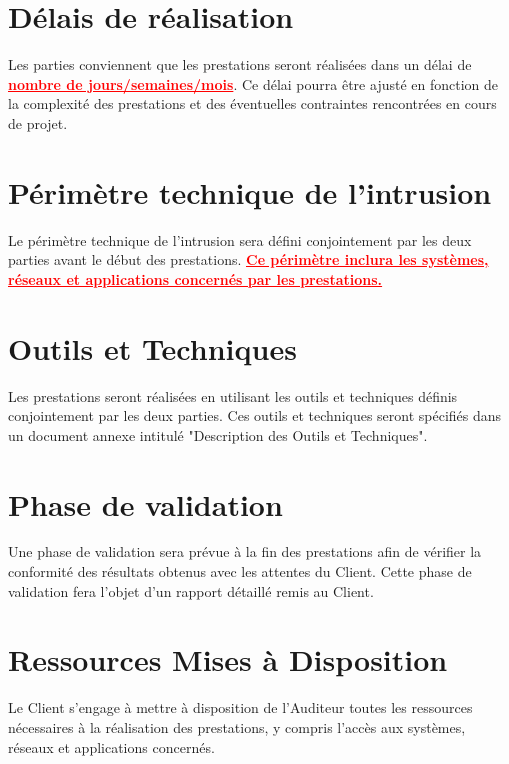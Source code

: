 \documentclass[12pt]{extarticle}
\begin{document}
\section{Délais de réalisation}
Les parties conviennent que les prestations seront réalisées dans un délai de \textcolor{red}{\textbf{\underline{nombre de jours/semaines/mois}}}. Ce délai pourra être ajusté en fonction de la complexité des prestations et des éventuelles contraintes rencontrées en cours de projet.

\section{Périmètre technique de l’intrusion}
Le périmètre technique de l'intrusion sera défini conjointement par les deux parties avant le début des prestations. \textcolor{red}{\textbf{\underline{Ce périmètre inclura les systèmes, réseaux et applications concernés par les prestations.}}}

\section{Outils et Techniques}
Les prestations seront réalisées en utilisant les outils et techniques définis conjointement par les deux parties. Ces outils et techniques seront spécifiés dans un document annexe intitulé "Description des Outils et Techniques".

\section{Phase de validation}
Une phase de validation sera prévue à la fin des prestations afin de vérifier la conformité des résultats obtenus avec les attentes du Client. Cette phase de validation fera l'objet d'un rapport détaillé remis au Client.

\section{Ressources Mises à Disposition}
Le Client s'engage à mettre à disposition de l'Auditeur toutes les ressources nécessaires à la réalisation des prestations, y compris l'accès aux systèmes, réseaux et applications concernés.
\end{document}
